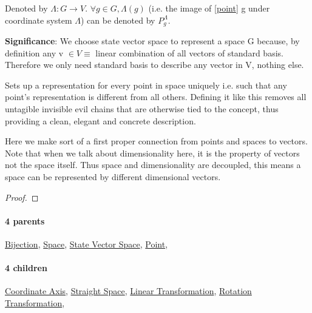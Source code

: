 \documentclass[../main.tex]{subfiles}
\begin{document}
Denoted by $ \Lambda: G \to V $. $\forall g \in G, \Lambda(g) $ (i.e. the image of [\hyperref[statement:Point]{point}] g under coordinate system $ \Lambda $) can be denoted by $P^{\Lambda}_{g}$.
\par
{\color{magenta} \textbf{Significance}:
We choose state vector space to represent a space G because, by definition any v $\in V \equiv $ linear combination of all vectors of standard basis.
Therefore we only need standard basis to describe any vector in V, nothing else.

Sets up a representation for every point in space uniquely i.e. such that any point's representation is different from all others.
Defining it like this removes all untagible invisible evil chains that are otherwise tied to the concept, thus providing a clean, elegant and concrete description.

Here we make sort of a first proper connection from points and spaces to vectors.
Note that when we talk about dimensionality here, it is the property of vectors not the space itself.
Thus space and dimensionality are decoupled, this means a space can be represented by different dimensional vectors.
\par}
\begin{proof}
\proofbydefinition
\end{proof}\par
\paragraph{4 parents} \hyperref[statement:Bijection]{Bijection}, \hyperref[statement:Space]{Space}, \hyperref[statement:State Vector Space]{State Vector Space}, \hyperref[statement:Point]{Point}, 
\paragraph{4 children} \hyperref[statement:Coordinate Axis]{Coordinate Axis}, \hyperref[statement:Straight Space]{Straight Space}, \hyperref[statement:Linear Transformation]{Linear Transformation}, \hyperref[statement:Rotation Transformation]{Rotation Transformation}, 
\end{document}
